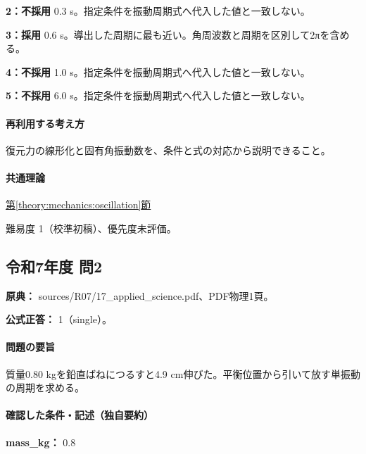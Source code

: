 \noindent\textbf{2：不採用} 0.3 s。指定条件を振動周期式へ代入した値と一致しない。\par

\noindent\textbf{3：採用} 0.6 s。導出した周期に最も近い。角周波数と周期を区別して2πを含める。\par

\noindent\textbf{4：不採用} 1.0 s。指定条件を振動周期式へ代入した値と一致しない。\par

\noindent\textbf{5：不採用} 6.0 s。指定条件を振動周期式へ代入した値と一致しない。\par

\paragraph{再利用する考え方} 復元力の線形化と固有角振動数を、条件と式の対応から説明できること。

\paragraph{共通理論} \hyperref[theory:mechanics:oscillation]{第\ref*{theory:mechanics:oscillation}節}

\par 難易度 1（校準初稿）、優先度未評価。

\subsection{令和7年度 問2}
\label{q:r07-reg-applied-02}

\noindent\textbf{原典：} sources/R07/17\_applied\_science.pdf、PDF物理1頁。

\textbf{公式正答：} 1（single）。

\paragraph{問題の要旨} 質量0.80 kgを鉛直ばねにつるすと4.9 cm伸びた。平衡位置から引いて放す単振動の周期を求める。

\paragraph{確認した条件・記述（独自要約）}\mbox{}\par

\noindent\textbf{mass\_kg：} 0.8\par

